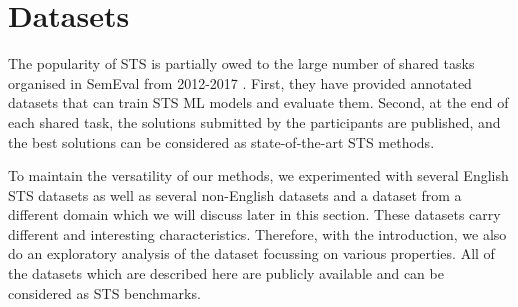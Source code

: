 \section{Datasets}
\label{sec:sts_intro_datsets}
The popularity of STS is partially owed to the large number of shared tasks organised in SemEval from 2012-2017 \autocite{agirre-etal-2012-semeval,agirre-etal-2013-sem,agirre-etal-2014-semeval,agirre-etal-2015-semeval,agirre-etal-2016-semeval,cer-etal-2017-semeval}. First, they have provided annotated datasets that can train STS ML models and evaluate them. Second, at the end of each shared task, the solutions submitted by the participants are published, and the best solutions can be considered as state-of-the-art STS methods. 

To maintain the versatility of our methods, we experimented with several English STS datasets as well as several non-English datasets and a dataset from a different domain which we will discuss later in this section. These datasets carry different and interesting characteristics. Therefore, with the introduction, we also do an exploratory analysis of the dataset focussing on various properties. All of the datasets which are described here are publicly available and can be considered as STS benchmarks. 

